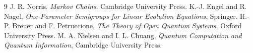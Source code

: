 \documentclass[11pt,a4paper]{article}
\begin{document}
\begin{thebibliography}{9}
 J. R. Norris, \emph{Markov Chains}, Cambridge University Press.
 K.-J. Engel and R. Nagel, \emph{One-Parameter Semigroups for Linear Evolution Equations}, Springer.
 H.-P. Breuer and F. Petruccione, \emph{The Theory of Open Quantum Systems}, Oxford University Press.
 M. A. Nielsen and I. L. Chuang, \emph{Quantum Computation and Quantum Information}, Cambridge University Press.
\end{thebibliography}
\end{document}
